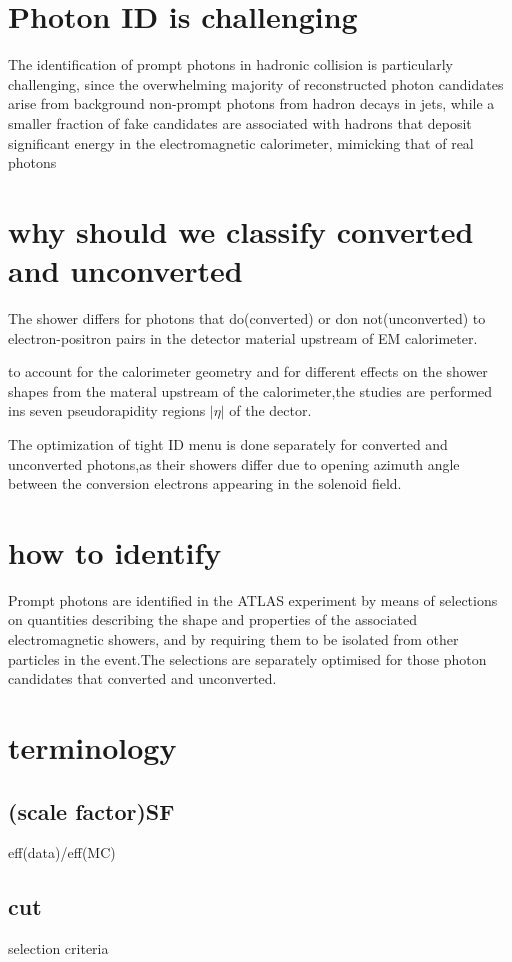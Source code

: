 \documentclass{ctexart}
\begin{document}
\section{Photon ID is challenging}
The identification of prompt photons in hadronic collision is particularly challenging, since the overwhelming  majority of reconstructed photon candidates arise from background non-prompt photons from hadron decays in jets, while a smaller fraction of fake candidates are associated with hadrons that deposit significant energy in the electromagnetic calorimeter, mimicking that of real photons

\section{why should we classify converted and unconverted}
The shower differs for photons that do(converted) or don not(unconverted) to electron-positron pairs in the detector material upstream of EM calorimeter.  \par
to account for the calorimeter geometry and  for different effects on the shower shapes from the materal upstream of the calorimeter,the studies are  performed ins seven pseudorapidity regions $|\eta|$ of the dector.\par
The optimization of tight ID menu is done separately for converted and unconverted photons,as their showers differ due to opening azimuth angle between the conversion electrons appearing in the solenoid field.

\section{how to identify}
Prompt photons are identified in the ATLAS experiment by means of selections on quantities describing the shape and properties of the associated electromagnetic showers, and by requiring them to be isolated from other particles in the event.The selections are separately optimised for those photon candidates that converted and unconverted.
\section{terminology}
\subsection{(scale factor)SF}
eff(data)/eff(MC)
\subsection{cut} selection criteria
\end{document}
